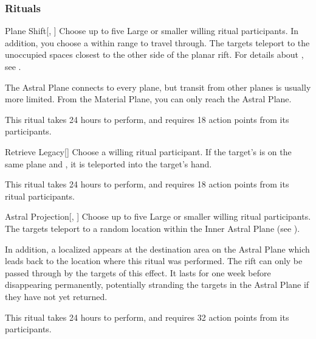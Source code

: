 \subsubsection{Rituals}


\lowercase{\hypertarget{spell:Plane Shift}{}}\label{spell:Plane Shift}
\begin{apability}[\nth{3}]{\hypertarget{spell:Plane Shift}{Plane Shift}}[, ]
Choose up to five Large or smaller willing ritual participants.
In addition, you choose a  within \rngmed range to travel through.
The targets teleport to the unoccupied spaces closest to the other side of the planar rift.
For details about , see .

The Astral Plane connects to every plane, but transit from other planes is usually more limited.
From the Material Plane, you can only reach the Astral Plane.

This ritual takes 24 hours to perform, and requires 18 action points from its participants.
\end{apability}
\vspace{0.25em}



\lowercase{\hypertarget{spell:Retrieve Legacy}{}}\label{spell:Retrieve Legacy}
\begin{apability}[\nth{3}]{\hypertarget{spell:Retrieve Legacy}{Retrieve Legacy}}[]
Choose a willing ritual participant.
If the target's  is on the same plane and , it is teleported into the target's hand.

This ritual takes 24 hours to perform, and requires 18 action points from its ritual participants.
\end{apability}
\vspace{0.25em}



\lowercase{\hypertarget{spell:Astral Projection}{}}\label{spell:Astral Projection}
\begin{apability}[\nth{4}]{\hypertarget{spell:Astral Projection}{Astral Projection}}[, ]
Choose up to five Large or smaller willing ritual participants.
The targets teleport to a random location within the Inner Astral Plane (see ).

In addition, a localized  appears at the destination area on the Astral Plane which leads back to the location where this ritual was performed.
The rift can only be passed through by the targets of this effect.
It lasts for one week before disappearing permanently, potentially stranding the targets in the Astral Plane if they have not yet returned.

This ritual takes 24 hours to perform, and requires 32 action points from its participants.
\end{apability}
\vspace{0.25em}



